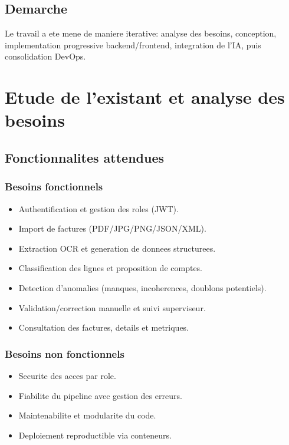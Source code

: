 \documentclass[12pt,a4paper]{report}
\begin{document}
\section{Demarche}
Le travail a ete mene de maniere iterative: analyse des besoins, conception, implementation progressive backend/frontend, integration de l'IA, puis consolidation DevOps.

\chapter{Etude de l'existant et analyse des besoins}
\section{Fonctionnalites attendues}
\subsection{Besoins fonctionnels}
\begin{itemize}
    \item Authentification et gestion des roles (JWT).
    \item Import de factures (PDF/JPG/PNG/JSON/XML).
    \item Extraction OCR et generation de donnees structurees.
    \item Classification des lignes et proposition de comptes.
    \item Detection d'anomalies (manques, incoherences, doublons potentiels).
    \item Validation/correction manuelle et suivi superviseur.
    \item Consultation des factures, details et metriques.
\end{itemize}

\subsection{Besoins non fonctionnels}
\begin{itemize}
    \item Securite des acces par role.
    \item Fiabilite du pipeline avec gestion des erreurs.
    \item Maintenabilite et modularite du code.
    \item Deploiement reproductible via conteneurs.
\end{itemize}
\end{document}
